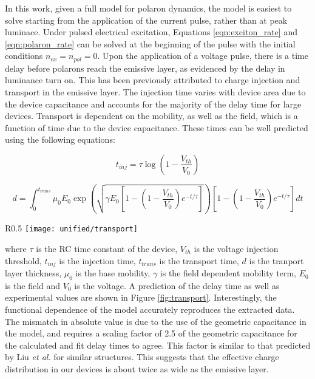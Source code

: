 \documentclass[../thesis.tex]{subfiles}
\begin{document}
In this work, given a full model for polaron dynamics, the model is easiest to solve starting from the application of the current pulse, rather than at peak luminace.
Under pulsed electrical excitation, Equations \ref{eqn:exciton_rate} and \ref{eqn:polaron_rate} can be solved at the beginning of the pulse with the initial conditions $n_{ex}=n_{pol}=0$.  
Upon the application of a voltage pulse, there is a time delay before polarons reach the emissive layer, as evidenced by the delay in luminance turn on.  
This has been previously attributed to charge injection and transport in the emissive layer.\cite{Wei2004}
The injection time varies with device area due to the device capacitance and accounts for the majority of the delay time for large devices.
Transport is dependent on the mobility, as well as the field, which is a function of time due to the device capacitance.  
These times can be well predicted using the following equations:

\begin{equation}
t_{inj}=\tau\log\left(1-\frac{V_{th}}{V_0}\right)
\end{equation}

\begin{equation}
d=\int_0^{t_{trans}}\mu_0 E_0 \exp \left( \sqrt{\gamma E_0\left[1-\left(1-\frac{V_{th}}{V_0}\right)e^{-t/\tau}\right]}\right)\left[1-\left(1-\frac{V_{th}}{V_0}\right)e^{-t/\tau}\right] dt
\end{equation}

\begin{wrapfigure}{R}{0.5\textwidth}
\centering
\texttt{[image: unified/transport]}
\caption{Extracted polaron injection time is shown as a function of voltage along with a fit from the model.}
\label{fig:transport}
\end{wrapfigure}

where $\tau$ is the RC time constant of the device, $V_{th}$ is the voltage injection threshold, $t_{inj}$ is the injection time, $t_{trans}$ is the transport time, $d$ is the tranport layer thickness, $\mu_0$ is the base mobility, $\gamma$ is the field dependent mobility term, $E_0$ is the field and $V_0$ is the voltage.
A prediction of the delay time as well as experimental values are shown in Figure \ref{fig:transport}.
Interestingly, the functional dependence of the model accurately reproduces the extracted data.
The mismatch in absolute value is due to the use of the geometric capacitance in the model, and requires a scaling factor of 2.5 of the geometric capacitance for the calculated and fit delay times to agree.  This factor is similar to that predicted by Liu \textit{et al.} for similar structures.\cite{Liu2012d}
This suggests that the effective charge distribution in our devices is about twice as wide as the emissive layer.
\end{document}
